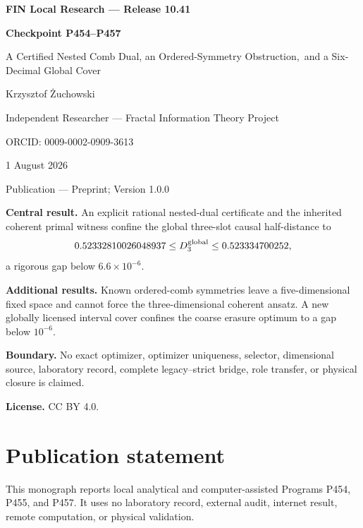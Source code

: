 \documentclass[11pt,a4paper,openany]{report}
\begin{document}
\hypersetup{pageanchor=false}
\begin{titlepage}
\centering
\vspace*{8mm}
{\Large\bfseries FIN Local Research --- Release 10.41\par}
\vspace{10mm}
{\Huge\bfseries Checkpoint P454--P457\par}
\vspace{6mm}
{\Large A Certified Nested Comb Dual, an Ordered-Symmetry Obstruction,\
and a Six-Decimal Global Cover\par}
\vspace{14mm}
{\Large Krzysztof \.Zuchowski\par}
\vspace{2mm}
{\normalsize Independent Researcher --- Fractal Information Theory Project\par}
\vspace{2mm}
{\normalsize ORCID: 0009-0002-0909-3613\par}
\vspace{8mm}
{\large 1 August 2026\par}
{\normalsize Publication --- Preprint; Version 1.0.0\par}
\vfill
\begin{minipage}{0.92\textwidth}
\small
\textbf{Central result.}
An explicit rational nested-dual certificate and the inherited coherent
primal witness confine the global three-slot causal half-distance to
\[
0.52332810026048937\le D_3^{\rm global}\le0.523334700252,
\]
a rigorous gap below $6.6\times10^{-6}$.

\medskip
\textbf{Additional results.}
Known ordered-comb symmetries leave a five-dimensional fixed space and cannot
force the three-dimensional coherent ansatz. A new globally licensed interval
cover confines the coarse erasure optimum to a gap below $10^{-6}$.

\medskip
\textbf{Boundary.}
No exact optimizer, optimizer uniqueness, selector, dimensional source,
laboratory record, complete legacy--strict bridge, role transfer, or physical
closure is claimed.

\medskip
\textbf{License.} CC BY 4.0.
\end{minipage}
\vfill
\end{titlepage}
\hypersetup{pageanchor=true}
\chapter*{Publication statement}
This monograph reports local analytical and computer-assisted Programs P454,
P455, and P457. It uses no laboratory record, external audit, internet result,
remote computation, or physical validation.
\tableofcontents
\clearpage
{}
\end{document}
